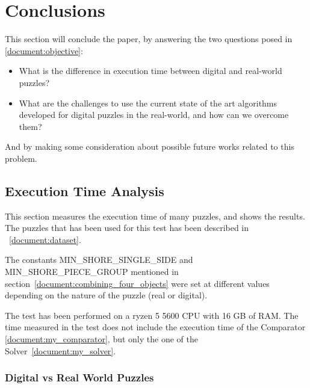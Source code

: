 \documentclass{article}
\begin{document}
\section{Conclusions}
This section will conclude the paper,
by answering the two questions posed in \cref{document:objective}:

\begin{itemize}
  \item What is the difference in execution time between
                digital and real-world puzzles?
  \item What are the challenges to use the current state of the art algorithms developed for digital
                puzzles in the real-world, and how can we overcome them?
\end{itemize}
And by making some consideration about possible future works related to this problem.

\subsection{Execution Time Analysis}

This section measures the execution time of many puzzles,
and shows the results. The puzzles that has been used for
this test has been described in ~\cref{document:dataset}.

The constants MIN\_SHORE\_SINGLE\_SIDE and MIN\_SHORE\_PIECE\_GROUP mentioned in
section~\cref{document:combining_four_objects} were set at different values
depending on the nature of the puzzle (real or digital).

The test has been performed on a ryzen 5 5600 CPU with 16 GB of RAM.
The time measured in the test does not include the execution time of the Comparator
\cref{document:my_comparator}, but only the one of the Solver~\cref{document:my_solver}.

\subsubsection{Digital vs Real World Puzzles}
\end{document}
